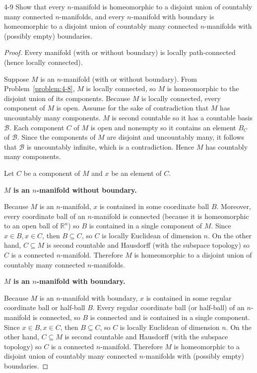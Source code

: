 \begin{problem}{4-9}
Show that every $n$-manifold is homeomorphic to a disjoint union of countably many connected $n$-manifolds, and every $n$-manifold with boundary is homeomorphic to a disjoint union of countably many connected $n$-manifolds with (possibly empty) boundaries.
\end{problem}

\begin{proof}
	Every manifold (with or without boundary) is locally path-connected (hence locally connected).

	Suppose $M$ is an $n$-manifold (with or without boundary). From Problem~\ref{problem:4-8}, $M$ is locally connected, so $M$ is homeomorphic to the disjoint union of its components. Because $M$ is locally connected, every component of $M$ is open. Assume for the sake of contradiction that $M$ has uncountably many components. $M$ is second countable so it has a countable basis $\mathscr{B}$. Each component $C$ of $M$ is open and nonempty so it contains an element $B_{C}$ of $\mathscr{B}$. Since the components of $M$ are disjoint and uncountably many, it follows that $\mathscr{B}$ is uncountably infinite, which is a contradiction. Hence $M$ has countably many components.

	Let $C$ be a component of $M$ and $x$ be an element of $C$.

	\textbf{$M$ is an $n$-manifold without boundary.}

	Because $M$ is an $n$-manifold, $x$ is contained in some coordinate ball $B$. Moreover, every coordinate ball of an $n$-manifold is connected (because it is homeomorphic to an open ball of $\mathbb{R}^{n}$) so $B$ is contained in a single component of $M$. Since $x\in B, x\in C$, then $B \subseteq C$, so $C$ is locally Euclidean of dimension $n$. On the other hand, $C\subseteq M$ is second countable and Hausdorff (with the subspace topology) so $C$ is a connected $n$-manifold. Therefore $M$ is homeomorphic to a disjoint union of countably many connected $n$-manifolds.

	\textbf{$M$ is an $n$-manifold with boundary.}

	Because $M$ is an $n$-manifold with boundary, $x$ is contained in some regular coordinate ball or half-ball $B$. Every regular coordinate ball (or half-ball) of an $n$-manifold is connected, so $B$ is connected and is contained in a single component. Since $x\in B, x\in C$, then $B\subseteq C$, so $C$ is locally Euclidean of dimension $n$. On the other hand, $C\subseteq M$ is second countable and Hausdorff (with the subspace topology) so $C$ is a connected $n$-manifold. Therefore $M$ is homeomorphic to a disjoint union of countably many connected $n$-manifolds with (possibly empty) boundaries.
\end{proof}

